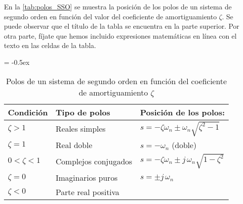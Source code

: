 \documentclass[11pt]{article}
\begin{document}
En la \autoref{tab:polos_SSO} se muestra la posición de los polos de un sistema de segundo orden en función del valor del coeficiente de amortiguamiento $\zeta$. Se puede observar que el título de la tabla se encuentra en la parte superior. Por otra parte, fíjate que hemos incluido expresiones matemáticas en línea con el texto en las celdas de la tabla.

\begin{table}[ht]
	\bigskip
	\centering

	\extrarowheight = -0.5ex
	\renewcommand{\arraystretch}{1.75}
	
	\captionsetup{width=0.7\textwidth}
	\caption{Polos de un sistema de segundo orden en función del coeficiente de amortiguamiento $\zeta$}
	\label{tab:polos_SSO}
	
	\begin{tabular}{ l l l }
	
	    \toprule
	    Condición
	    & 
	    Tipo de polos
	    & 
	    Posición de los polos: 
	    
	    \\ \midrule

	    $\zeta > 1$
        &
	    Reales simples
	    &
	    $s = -\zeta \omega_n \pm \omega_n \sqrt{\zeta^2 - 1}$

	    \\
	
	    $\zeta = 1$
	    &
		Real doble
	    &
	    $s = -\omega_n$ (doble)

	    \\
	
	    $0 < \zeta < 1$
	    &
	    Complejos conjugados
	    &
	    $s = -\zeta \omega_n \pm j\, \omega_n \sqrt{1 - \zeta^2}$

	    \\
	
	    $\zeta = 0$
	    &
	    Imaginarios puros
	    &
	    {$s = \pm j \, \omega_n$}

	    \\
	    
	    $\zeta < 0$
	    &
	    Parte real positiva
	    &
	    
        \\ \bottomrule
	
	\end{tabular}

	\bigskip

\end{table}


\end{document}
